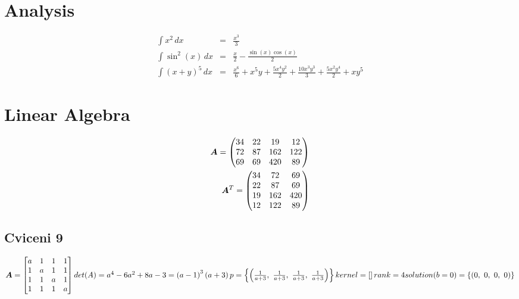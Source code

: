 \documentclass[12pt]{article}
\begin{document}
    \section{Analysis}\label{sec:analysis}

    \begin{align}
        \int x^{2}\, dx &=& \frac{x^{3}}{3} \\
        \int \sin^{2}{\left(x \right)}\, dx &=& \frac{x}{2} - \frac{\sin{\left(x \right)} \cos{\left(x \right)}}{2} \\
        \int \left(x + y\right)^{5}\, dx &=& \frac{x^{6}}{6} + x^{5} y + \frac{5 x^{4} y^{2}}{2} + \frac{10 x^{3} y^{3}}{3} + \frac{5 x^{2} y^{4}}{2} + x y^{5}
    \end{align}


    \section{Linear Algebra}\label{sec:linalg}

    \begin{align}
        {\bm{A}} = \left(\begin{matrix}
                        34 & 22 & 19 & 12\\72 & 87 & 162 & 122\\69 & 69 & 420 & 89
        \end{matrix}\right) \\
        {\bm{A}}^{T} = \left(\begin{matrix}
                            34 & 72 & 69\\22 & 87 & 69\\19 & 162 & 420\\12 & 122 & 89
        \end{matrix}\right)
    \end{align}

    \subsection{Cviceni 9}\label{subsec:cv9}

    \begin{math}
        {\bm{A}}=\left[\begin{matrix}
                      a & 1 & 1 & 1\\1 & a & 1 & 1\\1 & 1 & a & 1\\1 & 1 & 1 & a
        \end{matrix}\right] \\
        det(A)=a^{4} - 6 a^{2} + 8 a - 3=\left(a - 1\right)^{3} \left(a + 3\right) \\
        p=\left\{\left( \frac{1}{a + 3}, \  \frac{1}{a + 3}, \  \frac{1}{a + 3}, \  \frac{1}{a + 3}\right)\right\} \\
        kernel=\left[ \right] \\
        rank=4 \\
        solution (b=0)=\left\{\left( 0, \  0, \  0, \  0\right)\right\}
    \end{math}
\end{document}
